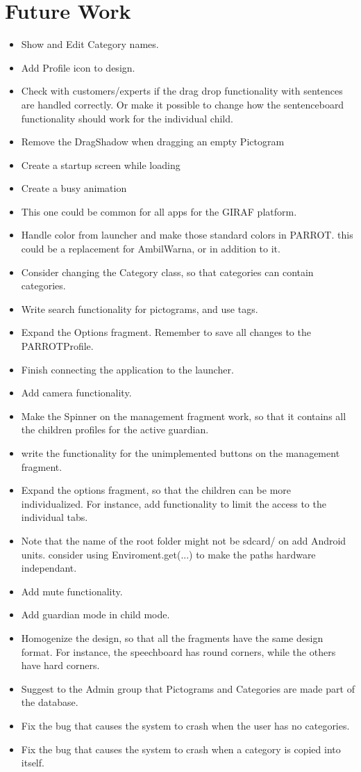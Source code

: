 \section{Future Work}
\begin{itemize}
	\item Show and Edit Category names.
	\item Add Profile icon to design.
	\item Check with customers/experts if the drag drop functionality with sentences are handled correctly.
		\subitem Or make it possible to change how the sentenceboard functionality should work for the individual child.
	\item Remove the DragShadow when dragging an empty Pictogram
	\item Create a startup screen while loading
	\item Create a busy animation
		\item This one could be common for all apps for the GIRAF platform.
	\item Handle color from launcher and make those standard colors in PARROT.
		\subitem this could be a replacement for AmbilWarna, or in addition to it.
	\item Consider changing the Category class, so that categories can contain categories.
	\item Write search functionality for pictograms, and use tags.
	\item Expand the Options fragment.
		\subitem Remember to save all changes to the PARROTProfile.
	\item Finish connecting the application to the launcher.
	\item Add camera functionality.
	\item Make the Spinner on the management fragment work, so that it contains all the children profiles for the active guardian.
	\item write the functionality for the unimplemented buttons on the management fragment.
	\item Expand the options fragment, so that the children can be more individualized.
		\subitem For instance, add functionality to limit the access to the individual tabs.
	\item Note that the name of the root folder might not be sdcard/ on add Android units.
		\subitem consider using Enviroment.get(...) to make the paths hardware independant.
	\item Add mute functionality.
	\item Add guardian mode in child mode.
	\item Homogenize the design, so that all the fragments have the same design format.
		\subitem For instance, the speechboard has round corners, while the others have hard corners.
	\item Suggest to the Admin group that Pictograms and Categories are made part of the database.
	\item Fix the bug that causes the system to crash when the user has no categories.
	\item Fix the bug that causes the system to crash when a category is copied into itself.
\end{itemize}


